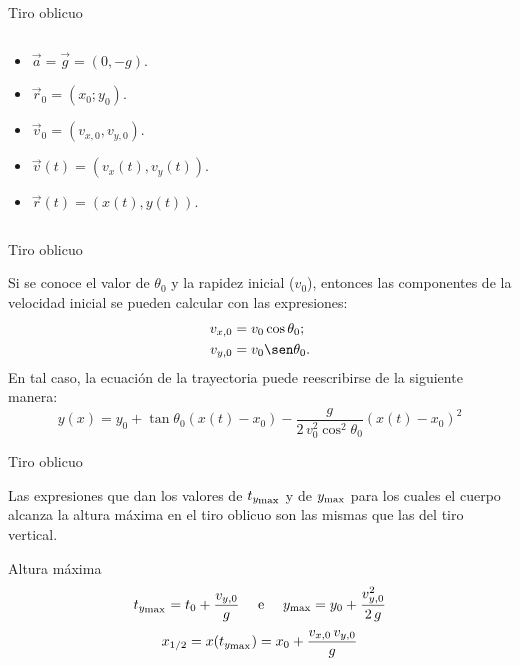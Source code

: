 \documentclass[11pt,handout,aspectratio=1610]{beamer}
\begin{document}
\begin{frame}{Tiro oblicuo}
\begin{columns}
        \begin{column}{0.5\textwidth}
            \begin{itemize}
                \item $\vec{a} = \vec{g} = (0,-g)$.
                \item $\vec{r}_0 = \left(x_0 ; y_0\right)$.
                \item $\vec{v}_0 = (v_{x,0},v_{y,0})$.
                \item $\vec{v} (t) = (v_x (t),v_y(t))$.
                \item $\vec{r} (t) = (x(t),y(t))$.
            \end{itemize}
        \end{column}
    \end{columns}
    
\end{frame}

\begin{frame}{Tiro oblicuo}

    Si se conoce el valor de $\theta_0$ y la rapidez inicial ($v_0$), entonces las componentes de la velocidad inicial se pueden calcular con las expresiones:
    \begin{align*}
        v_{x,0} &= v_0 \cos \theta_0; \\
        v_{y,0} &= v_0 \sen \theta_0.
    \end{align*} En tal caso, la ecuación de la trayectoria puede reescribirse de la siguiente manera: $$ y(x) = y_0 + \tan \theta_0 \left(x (t) - x_0 \right) - \frac{g}{2 \, v_0^2 \cos^2 \theta_0} \left(x(t) - x_0\right)^2$$

\end{frame}

\begin{frame}{Tiro oblicuo}

    Las expresiones que dan los valores de $t_{y_\text{\scriptsize max}}$ y de $y_\text{\scriptsize max}$ para los cuales el cuerpo alcanza la altura máxima en el tiro oblicuo son las mismas que las del tiro vertical. \pause 

    \begin{block}{Altura máxima}
        $$ t_{y_\text{\scriptsize max}} = t_0 + \frac{v_{y,0}}{g} \quad \text{ e } \quad y_\text{\scriptsize max} = y_0 + \frac{v_{y,0}^2}{2 \, g}$$
        $$x_{1/2} = x(t_{y_\text{\scriptsize max}}) = x_0 + \frac{v_{x,0} \, v_{y,0}}{g} $$
    \end{block}

\end{frame}
\end{document}
